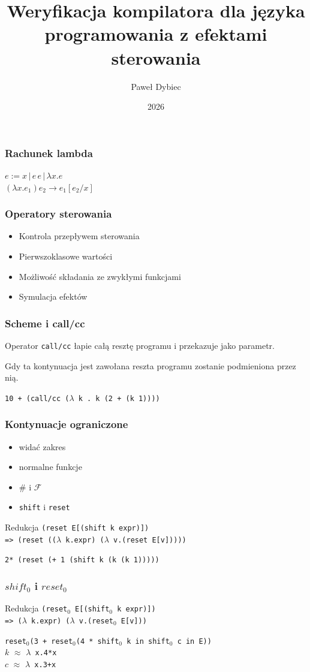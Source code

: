 \documentclass[polish]{beamer}
\title{Weryfikacja kompilatora dla języka programowania z efektami sterowania}
\author{Paweł Dybiec}
\date{2026}
\begin{document}
\frame{\titlepage}
\begin{frame}
\frametitle{Rachunek lambda}
$ e := x\, |\, e\, e\, |\, \lambda x . e$ \\
$ (\lambda x . e_1 ) e_2 \rightarrow e_1 [e_2 /x]$
\end{frame}
\begin{frame}
\frametitle{ Operatory sterowania}
\begin{itemize}
\item Kontrola przepływem sterowania
\item Pierwszoklasowe wartości
\item Możliwość składania ze zwykłymi funkcjami
\item Symulacja efektów
\end{itemize}
\end{frame}
\begin{frame}
\frametitle{Scheme\cite{scheme} i call/cc}
Operator \texttt{call/cc} łapie całą resztę programu i przekazuje jako parametr.

Gdy ta kontynuacja jest zawołana reszta programu zostanie podmieniona przez nią.
\begin{examples}
\texttt{10 + (call/cc ($\lambda$ k . k (2 + (k 1))))}
\end{examples}
\end{frame}
\begin{frame}
\frametitle{Kontynuacje ograniczone}
\begin{itemize}
\item widać zakres
\item normalne funkcje
\item $\#$ i  $\mathcal {F}$ \cite{prompts}
\item \texttt{shift} i \texttt{reset} \cite{abstracting}
\end{itemize}
\begin{block}{Redukcja}
\texttt{(reset E[(shift k expr)]) \\ => (reset (($\lambda$ k.expr) ($\lambda$ v.(reset E[v]))))}
\end{block}
\begin{examples}
\texttt{2* (reset (+ 1 (shift k (k (k 1)))))}
\end{examples}
\end{frame}
\begin{frame}
\frametitle{$shift_0$ i $reset_0$ \cite{functional_abstraction}}
\begin{block}{Redukcja}
\texttt{(reset$_0$ E[(shift$_0$ k expr)]) \\ => ($\lambda$ k.expr) ($\lambda$ v.(reset$_0$ E[v]))}
\end{block}

\begin{examples}
 \texttt{reset$_0$(3 + reset$_0$(4 * shift$_0$ k in shift$_0$ c in E))} \\
 $k$ $\approx$ \texttt{$\lambda$ x.4*x}\\
 $c$ $\approx$ \texttt{$\lambda$ x.3+x}
\end{examples}
\end{frame}
\end{document}
